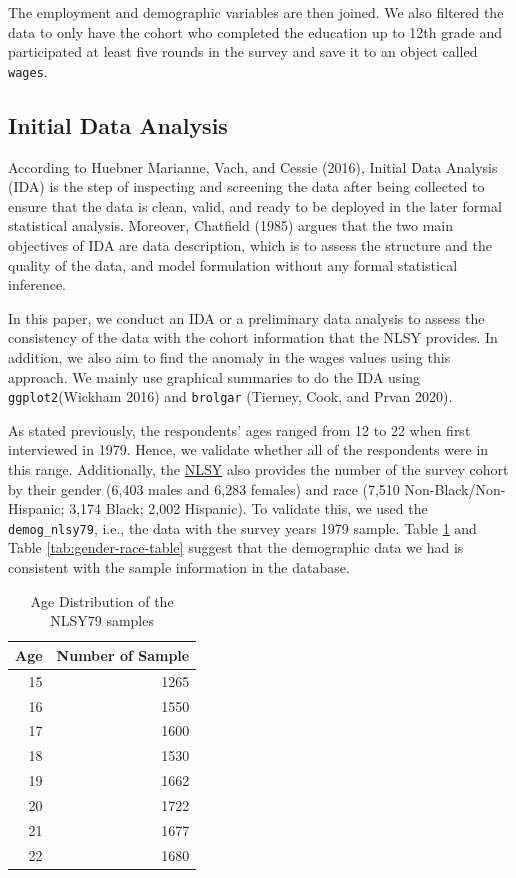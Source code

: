 \documentclass{article}
\begin{document}
The employment and demographic variables are then joined. We also filtered the data to only have the cohort who completed the education up to 12th grade and participated at least five rounds in the survey and save it to an object called \texttt{wages}.

\hypertarget{initial-data-analysis}{%
\subsection{Initial Data Analysis}\label{initial-data-analysis}}

According to Huebner Marianne, Vach, and Cessie (2016), Initial Data Analysis (IDA) is the step of inspecting and screening the data after being collected to ensure that the data is clean, valid, and ready to be deployed in the later formal statistical analysis. Moreover, Chatfield (1985) argues that the two main objectives of IDA are data description, which is to assess the structure and the quality of the data, and model formulation without any formal statistical inference.

In this paper, we conduct an IDA or a preliminary data analysis to assess the consistency of the data with the cohort information that the NLSY provides. In addition, we also aim to find the anomaly in the wages values using this approach. We mainly use graphical summaries to do the IDA using \texttt{ggplot2}(Wickham 2016) and \texttt{brolgar} (Tierney, Cook, and Prvan 2020).

As stated previously, the respondents' ages ranged from 12 to 22 when first interviewed in 1979. Hence, we validate whether all of the respondents were in this range. Additionally, the \href{https://www.nlsinfo.org/content/cohorts/nlsy79/intro-to-the-sample/nlsy79-sample-introduction}{NLSY} also provides the number of the survey cohort by their gender (6,403 males and 6,283 females) and race (7,510 Non-Black/Non-Hispanic; 3,174 Black; 2,002 Hispanic). To validate this, we used the \texttt{demog\_nlsy79}, i.e., the data with the survey years 1979 sample. Table \ref{tab:age-table} and Table \ref{tab:gender-race-table} suggest that the demographic data we had is consistent with the sample information in the database.

\begin{table}

\caption{\label{tab:age-table}Age Distribution of the NLSY79 samples}
\centering
\begin{tabular}[t]{r|r}
\hline
Age & Number of Sample\\
\hline
15 & 1265\\
\hline
16 & 1550\\
\hline
17 & 1600\\
\hline
18 & 1530\\
\hline
19 & 1662\\
\hline
20 & 1722\\
\hline
21 & 1677\\
\hline
22 & 1680\\
\hline
\end{tabular}
\end{table}
\end{document}
